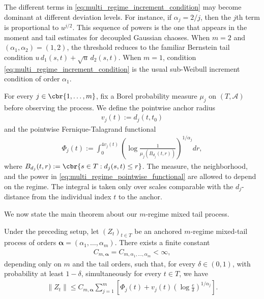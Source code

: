 \documentclass[11pt]{article}
\begin{document}
The different terms in \eqref{eq:multi_regime_increment_condition} may
become dominant at different deviation levels. For instance, if
$\alpha_j=2/j$, then the $j$th term is proportional to $u^{j/2}$.
This sequence of powers is the one that appears in the moment and tail
estimates for decoupled Gaussian chaoses. When $m=2$ and
$(\alpha_1,\alpha_2)=(1,2)$, the threshold reduces to the familiar
Bernstein tail condition $u\,d_1(s,t)+\sqrt{u}\,d_2(s,t)$. When $m=1$, condition \eqref{eq:multi_regime_increment_condition} is the
usual sub-Weibull increment condition of order $\alpha_1$.

For every $j\in\cbr{1,\ldots,m}$, fix a Borel probability measure
$\mu_j$ on $(T,\mathcal A)$ before observing the process. We define the
pointwise anchor radius
\begin{align*}
v_j(t):=d_j(t,t_0)
\end{align*}
and the pointwise
Fernique-Talagrand functional
\begin{align}
\Phi_j(t)
:=
\int_0^{4v_j(t)}
\left(
\log\frac{1}{\mu_j(B_{d_j}(t,r))}
\right)^{1/\alpha_j}dr,
\label{eq:multi_regime_pointwise_functional}
\end{align}
where $B_{d_j}(t,r)
:=
\cbr{s\in T:d_j(s,t)\le r}$.
The measure, the neighborhood, and the power in
\eqref{eq:multi_regime_pointwise_functional} are allowed to depend on
the regime. The integral is taken only over scales comparable with the
$d_j$-distance from the individual index $t$ to the anchor.

We now state the main theorem about our $m$-regime mixed tail process.
\begin{theorem}
\label{thm:multi_regime_majorization}
Under the preceding setup, let $(Z_t)_{t\in T}$ be an anchored
$m$-regime mixed-tail process of orders
$\boldsymbol\alpha=(\alpha_1,\ldots,\alpha_m)$. There exists a finite
constant
\begin{align*}
C_{m,\boldsymbol\alpha}
=
C_{m,\alpha_1,\ldots,\alpha_m}<\infty,
\end{align*}
depending only on $m$ and the tail orders, such that, for every
$\delta\in(0,1)$, with probability at least $1-\delta$,
simultaneously for every $t\in T$, we have
\begin{align}
\|Z_t\|
\le
C_{m,\boldsymbol\alpha}
\sum_{j=1}^m
\left[
\Phi_j(t)
+
v_j(t)
\left(
\log\frac{e}{\delta}
\right)^{1/\alpha_j}
\right].
\label{eq:multi_regime_pointwise_bound}
\end{align}
\end{theorem}
\end{document}
